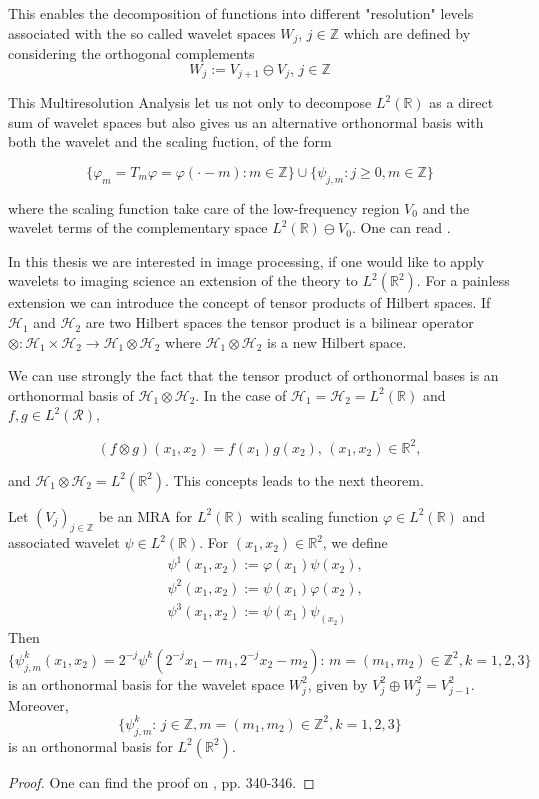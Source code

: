 This enables the decomposition of functions into different "resolution" levels associated with the so called wavelet spaces $W_j$, $j\in\mathbb{Z}$ which are defined by considering the orthogonal complements
$$
W_j:= V_{j+1}\ominus V_j\text{,  } j\in\mathbb{Z}
$$

This Multiresolution Analysis let us not only to decompose $L^2(\mathbb{R})$ as a direct sum of wavelet spaces but also gives us an alternative orthonormal basis with both the wavelet and the scaling fuction, of the form

$$
\{\varphi_m=T_m\varphi=\varphi(\cdot-m):m\in\mathbb{Z}\}\cup\{\psi_{j,m}:j\geq 0,m\in\mathbb{Z}\}
$$

where the scaling function take care of the low-frequency region $V_0$ and the wavelet terms of the complementary space $L^2(\mathbb{R})\ominus V_0$. One can read \cite{Mallat}. 

\bigskip

In this thesis we are interested in image processing, if one would like to apply wavelets to imaging science an extension of the theory to $L^2(\mathbb{R}^2)$. For a painless extension we can introduce the concept of tensor products of Hilbert spaces. If $\mathcal{H}_1$ and $\mathcal{H}_2$ are two Hilbert spaces the tensor product is a bilinear operator $\otimes:\mathcal{H}_1\times\mathcal{H}_2\longrightarrow \mathcal{H}_1\otimes\mathcal{H}_2$ where $\mathcal{H}_1\otimes\mathcal{H}_2$ is a new Hilbert space.

\bigskip

We can use strongly the fact that the tensor product of orthonormal bases is an orthonormal basis of $\mathcal{H}_1\otimes\mathcal{H}_2$. In the case of $\mathcal{H}_1=\mathcal{H}_2=L^2(\mathbb{R})$ and $f,g\in L^2(\mathcal{R})$,

$$
(f\otimes g)(x_1,x_2)=f(x_1)g(x_2)\text{,  } (x_1,x_2)\in\mathbb{R}^2,
$$

and $\mathcal{H}_1\otimes\mathcal{H}_2=L^2(\mathbb{R}^2)$. This concepts leads to the next theorem.

\bigskip

\begin{thm}
Let $(V_j)_{j\in\mathbb{Z}}$ be an MRA for $L^2(\mathbb{R})$ with scaling function $\varphi\in L^2(\mathbb{R})$ and associated wavelet $\psi\in L^2(\mathbb{R})$. For $(x_1,x_2)\in\mathbb{R}^2$, we define
$$
\begin{aligned}
&\psi^1(x_1,x_2):=\varphi(x_1)\psi(x_2),\\
&\psi^2(x_1,x_2):=\psi(x_1)\varphi(x_2),\\
&\psi^3(x_1,x_2):=\psi(x_1)\psi_(x_2)
\end{aligned}
$$
Then 
$$
\{\psi_{j,m}^k(x_1,x_2)=2^{-j}\psi^k(2^{-j}x_1-m_1,2^{-j}x_2-m_2)\text{: } m=(m_1,m_2)\in\mathbb{Z}^2,k=1,2,3\}
$$
is an orthonormal basis for the wavelet space $W^2_j$, given by $V^2_j\oplus W^2_j=V^2_{j-1}$. Moreover,
$$
\{\psi_{j,m}^k\text{:  }j\in\mathbb{Z},m=(m_1,m_2)\in\mathbb{Z}^2,k=1,2,3\}
$$
is an orthonormal basis for $L^2(\mathbb{R}^2)$.
\end{thm}
\begin{proof}
One can find the proof on \cite{Mallat}, pp. 340-346.
\end{proof}


